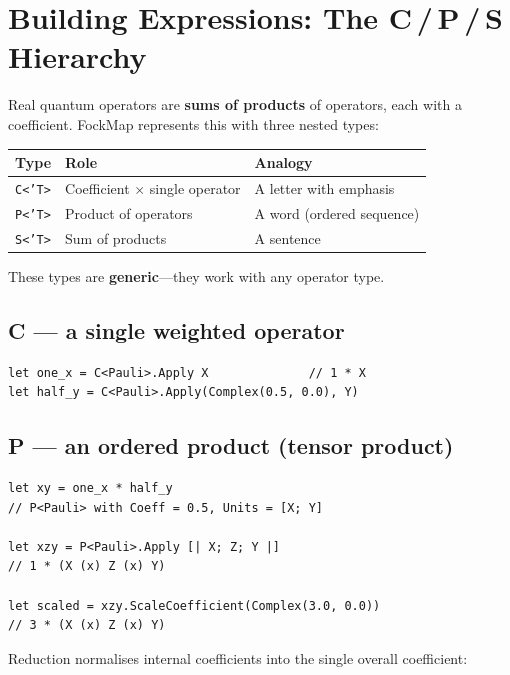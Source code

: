 \documentclass[10pt,a4paper]{article}
\begin{document}
\section{Building Expressions: The C\,/\,P\,/\,S Hierarchy}\label{ch:cps}

Real quantum operators are \textbf{sums of products} of operators, each
with a coefficient.  FockMap represents this with three nested types:

\begin{center}
\begin{tabular}{lll}
\toprule
\textbf{Type} & \textbf{Role} & \textbf{Analogy} \\
\midrule
\texttt{C<'T>} & Coefficient $\times$ single operator & A letter with emphasis \\
\texttt{P<'T>} & Product of operators & A word (ordered sequence) \\
\texttt{S<'T>} & Sum of products & A sentence \\
\bottomrule
\end{tabular}
\end{center}

These types are \textbf{generic}---they work with any operator type.

\subsection{C --- a single weighted operator}

\begin{lstlisting}
let one_x = C<Pauli>.Apply X              // 1 * X
let half_y = C<Pauli>.Apply(Complex(0.5, 0.0), Y)
\end{lstlisting}

\subsection{P --- an ordered product (tensor product)}

\begin{lstlisting}
let xy = one_x * half_y
// P<Pauli> with Coeff = 0.5, Units = [X; Y]

let xzy = P<Pauli>.Apply [| X; Z; Y |]
// 1 * (X (x) Z (x) Y)

let scaled = xzy.ScaleCoefficient(Complex(3.0, 0.0))
// 3 * (X (x) Z (x) Y)
\end{lstlisting}

Reduction normalises internal coefficients into the single overall
coefficient:
\end{document}
